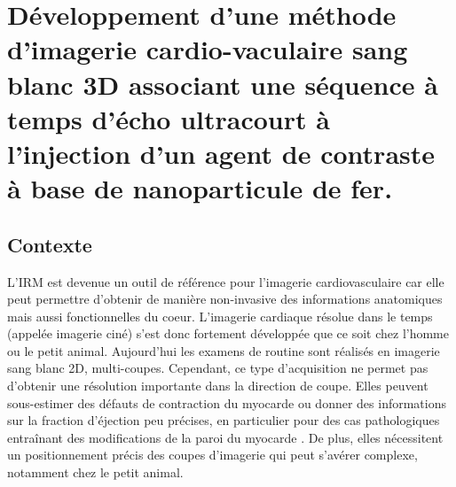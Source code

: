 
\chapter{Développement d'une méthode d'imagerie cardio-vaculaire sang blanc 3D associant une séquence à temps d'écho ultracourt à l'injection d'un agent de contraste à base de nanoparticule de fer.}
\setlength{\footskip}{50pt}
\label{Chap4}
\section{Contexte}


L’IRM est devenue un outil de référence pour l’imagerie cardiovasculaire car elle peut permettre d’obtenir de manière non-invasive des informations anatomiques mais aussi fonctionnelles du coeur. L’imagerie cardiaque résolue dans le temps (appelée imagerie ciné) s’est donc fortement développée que ce soit chez l’homme ou le petit animal. 
Aujourd'hui les examens de routine sont réalisés en imagerie sang blanc 2D, multi-coupes. Cependant, ce type d'acquisition ne permet pas d’obtenir une résolution importante dans la direction de coupe. Elles peuvent sous-estimer des défauts de contraction du myocarde ou donner des informations sur la fraction d’éjection peu précises, en particulier pour des cas pathologiques entraînant des modifications de la paroi du myocarde \cite{Friedrich:2000aa}. De plus, elles nécessitent un positionnement précis des coupes d'imagerie qui peut s'avérer complexe, notamment chez le petit animal.

